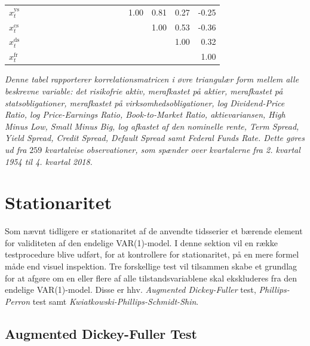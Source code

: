 \documentclass[
  a4paper,
  oneside]{memoir}
\begin{document}
\begin{table}[H]
{\begin{threeparttable}
\begin{tabular}[t]{lrrrrrrrrrrrrrrrr}
\rowcolor{gray!6}  $x_t^{\text{ys}}$ &  &  &  &  &  &  &  &  &  &  &  &  & 1.00 & 0.81 & 0.27 & -0.25\\
$x_t^{\text{cs}}$ &  &  &  &  &  &  &  &  &  &  &  &  &  & 1.00 & 0.53 & -0.36\\
\rowcolor{gray!6}  $x_t^{\text{ds}}$ &  &  &  &  &  &  &  &  &  &  &  &  &  &  & 1.00 & 0.32\\
$x_t^{\text{fr}}$ &  &  &  &  &  &  &  &  &  &  &  &  &  &  &  & 1.00\\
\bottomrule
\end{tabular}
\begin{tablenotes}
\item \textit{Denne tabel rapporterer korrelationsmatricen i øvre triangulær form mellem alle beskrevne variable: det risikofrie aktiv, merafkastet på aktier, merafkastet på statsobligationer, merafkastet på virksomhedsobligationer, log Dividend-Price Ratio, log Price-Earnings Ratio, Book-to-Market Ratio, aktievariansen, High Minus Low, Small Minus Big, log afkastet af den nominelle rente, Term Spread, Yield Spread, Credit Spread, Default Spread samt Federal Funds Rate. Dette gøres ud fra $259$ kvartalvise observationer, som spænder over kvartalerne fra 2. kvartal 1954 til 4. kvartal 2018.}
\end{tablenotes}
\end{threeparttable}}
\end{table}

\hypertarget{stationaritet}{%
\section{Stationaritet}\label{stationaritet}}

Som nævnt tidligere er stationaritet af de anvendte tidsserier et bærende element for validiteten af den endelige VAR(1)-model. I denne sektion vil en række testprocedure blive udført, for at kontrollere for stationaritet, på en mere formel måde end visuel inspektion. Tre forskellige test vil tilsammen skabe et grundlag for at afgøre om en eller flere af alle tilstandsvariablene skal ekskluderes fra den endelige VAR(1)-model. Disse er hhv. \emph{Augmented Dickey-Fuller} test, \emph{Phillips-Perron} test samt \emph{Kwiatkowski-Phillips-Schmidt-Shin}.

\hypertarget{augmented-dickey-fuller-test-1}{%
\subsection{Augmented Dickey-Fuller Test}\label{augmented-dickey-fuller-test-1}}
\end{document}
